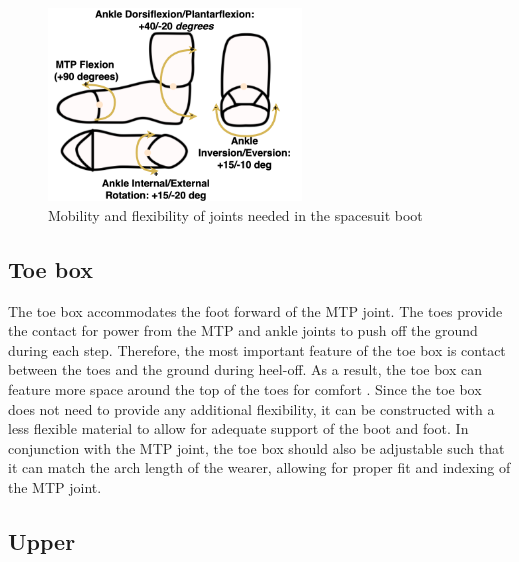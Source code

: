 \documentclass[defaultstyle,11pt]{thesis}
\begin{document}
\begin{figure}
\hypertarget{fig:SA3-Mobility}{%
\centering
\includegraphics[width=0.6\textwidth,height=\textheight]{../fig/SA3/Mobility.png}
\caption{Mobility and flexibility of joints needed in the spacesuit boot}\label{fig:SA3-Mobility}
}
\end{figure}

\hypertarget{toe-box}{%
\subsection{Toe box}\label{toe-box}}

The toe box accommodates the foot forward of the MTP joint.
The toes provide the contact for power from the MTP and ankle joints to push off the ground during each step.
Therefore, the most important feature of the toe box is contact between the toes and the ground during heel-off.
As a result, the toe box can feature more space around the top of the toes for comfort \citep{Luximon2009}.
Since the toe box does not need to provide any additional flexibility, it can be constructed with a less flexible material to allow for adequate support of the boot and foot.
In conjunction with the MTP joint, the toe box should also be adjustable such that it can match the arch length of the wearer, allowing for proper fit and indexing of the MTP joint.

\hypertarget{upper}{%
\subsection{Upper}\label{upper}}
\end{document}
